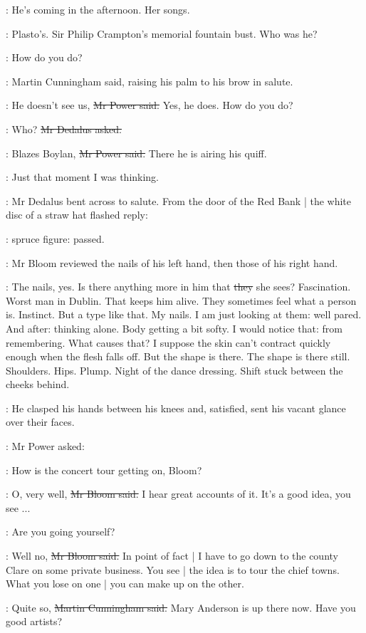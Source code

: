 \BloomInt:
He's coming in the afternoon.
Her songs.

\BloomInt:
Plasto's.
Sir Philip Crampton's memorial fountain bust.
Who was he?

\cunningham:
How do you do?

:
Martin Cunningham said,
raising his palm to his brow in salute.

\power:
He doesn't see us,
\sout{Mr Power said.}
Yes, he does.
How do you do?

\simon:
Who?
\sout{Mr Dedalus asked.}

\power:
Blazes Boylan,
\sout{Mr Power said.}
There he is airing his quiff.

\BloomInt:
Just that moment I was thinking.

:
Mr Dedalus bent across to salute.
From the door of the Red Bank |
the white disc of a straw hat flashed reply:

\BloomInt:
spruce figure:
passed.

:
Mr Bloom reviewed the nails of his left hand,
then those of his right hand.

\BloomInt:
The nails, yes.
Is there anything more in him that \sout{they} she sees?
Fascination.
Worst man in Dublin.
That keeps him alive.
They sometimes feel what a person is.
Instinct.
But a type like that.
My nails.
I am just looking at them:
well pared.
And after:
thinking alone.
Body getting a bit softy.
I would notice that:
from remembering.
What causes that?
I suppose the skin can't contract quickly enough when the flesh falls off.
But the shape is there.
The shape is there still.
Shoulders.
Hips.
Plump.
Night of the dance dressing.
Shift stuck between the cheeks behind.

:
He clasped his hands between his knees
and, satisfied,
sent his vacant glance
over their faces.

:
Mr Power asked:

\power:
How is the concert tour getting on, Bloom?

\Bloom:
O, very well,
\sout{Mr Bloom said.}
I hear great accounts of it.
It's a good idea, you see ...

\power:
Are you going yourself?

\Bloom:
Well no,
\sout{Mr Bloom said.}
In point of fact |
I have to go down to the county Clare on some private business.
You see |
the idea is to tour the chief towns.
What you lose on one |
you can make up on the other.

\cunningham:
Quite so,
\sout{Martin Cunningham said.}
Mary Anderson is up there now.
Have you
good artists?

